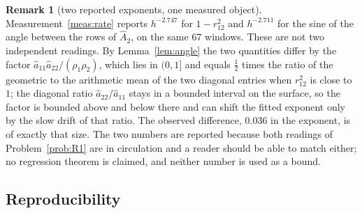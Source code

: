 \documentclass[11pt,a4paper]{article}
\theoremstyle{plain}
\theoremstyle{definition}
\newtheorem{remark}[theorem]{Remark}
\newcommand{\Ah}{\widehat{A}}
\newcommand{\ah}{\widehat{a}}
\begin{document}
\begin{remark}[two reported exponents, one measured object]
\label{rem:twoexponents}
Measurement~\ref{meas:rate} reports $h^{-2.747}$ for $1-r_{12}^{2}$ and
$h^{-2.711}$ for the sine of the angle between the rows of $\Ah_2$, on the same
$67$ windows. These are not two independent readings. By
Lemma~\ref{lem:angle} the two quantities differ by the factor
$\ah_{11}\ah_{22}/(\rho_1\rho_2)$, which lies in $(0,1]$ and equals
$\tfrac12$ times the ratio of the geometric to the arithmetic mean of the two
diagonal entries when $r_{12}^{2}$ is close to $1$; the diagonal ratio
$\ah_{22}/\ah_{11}$ stays in a bounded interval on the surface, so the factor
is bounded above and below there and can shift the fitted exponent only by the
slow drift of that ratio. The observed difference, $0.036$ in the exponent, is
of exactly that size. The two numbers are reported because both readings of
Problem~\ref{prob:R1} are in circulation and a reader should be able to match
either; no regression theorem is claimed, and neither number is used as a
bound.
\end{remark}

\subsection{Reproducibility}
\label{sec:repro}
\end{document}
